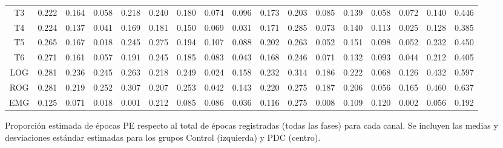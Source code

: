 \documentclass[12pt,a4paper]{mitthesis}
\begin{document}
\begin{SidewaysFigure}
\begin{tabular}{c||ccccc|cc||cccc|cc||ccc}
T3&0.222&0.164&0.058&0.218&0.240&0.180&0.074&0.096&0.173&0.203&0.085&0.139&0.058&0.072&0.140&0.446 \\
T4&0.224&0.137&0.041&0.169&0.181&0.150&0.069&0.031&0.171&0.285&0.073&0.140&0.113&0.025&0.128&0.385 \\
T5&0.265&0.167&0.018&0.245&0.275&0.194&0.107&0.088&0.202&0.263&0.052&0.151&0.098&0.052&0.232&0.450 \\
T6&0.271&0.161&0.057&0.191&0.245&0.185&0.083&0.043&0.168&0.246&0.071&0.132&0.093&0.044&0.212&0.405 \\
LOG&0.281&0.236&0.245&0.263&0.218&0.249&0.024&0.158&0.232&0.314&0.186&0.222&0.068&0.126&0.432&0.597 \\
ROG&0.281&0.219&0.252&0.307&0.207&0.253&0.042&0.143&0.220&0.275&0.187&0.206&0.056&0.165&0.460&0.637 \\
EMG&0.125&0.071&0.018&0.001&0.212&0.085&0.086&0.036&0.116&0.275&0.008&0.109&0.120&0.002&0.056&0.192
\end{tabular}
\caption{Proporci\'on estimada de \'epocas PE respecto al total de \'epocas registradas (todas las 
fases) para cada canal. Se incluyen las medias y desviaciones est\'andar estimadas para los grupos 
Control (izquierda) y PDC (centro).}
\label{gpos_total}
\end{SidewaysFigure}

\end{document}
